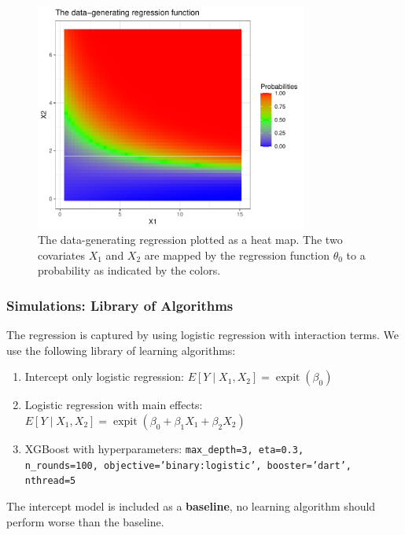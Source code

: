 \documentclass{beamer}
\DeclareMathOperator{\expit}{expit}
\begin{document}
\begin{frame}
\begin{figure}[H]
    \centering
    \includegraphics[width=0.8\textwidth]{figures/trueplot.pdf}
    \caption{The data-generating regression plotted as a heat map. The two covariates $ X_1 $ and $ X_2 $ are mapped by the regression function $ \theta_0 $ to a probability as indicated by the colors.}
    \label{fig:trueplot}
\end{figure}
\end{frame}


\begin{frame}
    \frametitle{Simulations: Library of Algorithms} 
The regression is captured by using logistic regression with interaction terms. We use the following library of learning algorithms:
\begin{enumerate}
    \item Intercept only logistic regression: $E[Y \mid X_1, X_2] = \expit(\beta_0)$
    \item Logistic regression with main effects: $E[Y \mid X_1, X_2] = \expit(\beta_0 + \beta_1 X_1 + \beta_2 X_2)$
    \item XGBoost with hyperparameters: \texttt{max\_depth=3, eta=0.3,\\ n\_rounds=100, objective='binary:logistic', booster='dart', nthread=5}
\end{enumerate}
The intercept model is included as a \textbf{baseline}, no learning algorithm should perform worse than the baseline. 
\end{frame}
\end{document}
